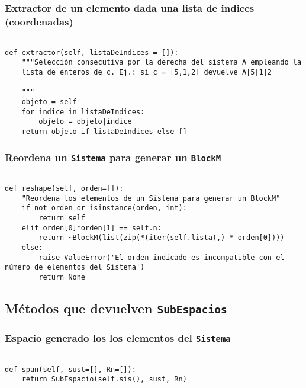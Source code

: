 \documentclass[11pt]{report}
\begin{document}
\subsubsection{Extractor de un elemento dada una lista de indices (coordenadas)}
\label{sec:orgeddb735}

\begin{verbatim}

def extractor(self, listaDeIndices = []):
    """Selección consecutiva por la derecha del sistema A empleando la
    lista de enteros de c. Ej.: si c = [5,1,2] devuelve A|5|1|2

    """
    objeto = self
    for indice in listaDeIndices:
        objeto = objeto|indice
    return objeto if listaDeIndices else []

\end{verbatim}

\subsubsection{Reordena un \texttt{Sistema} para generar un \texttt{BlockM}}
\label{sec:org737c281}
\begin{verbatim}
   
def reshape(self, orden=[]):
    "Reordena los elementos de un Sistema para generar un BlockM"
    if not orden or isinstance(orden, int):
        return self
    elif orden[0]*orden[1] == self.n:
        return ~BlockM(list(zip(*(iter(self.lista),) * orden[0])))
    else:
        raise ValueError('El orden indicado es incompatible con el número de elementos del Sistema')
        return None

\end{verbatim}

\subsection{Métodos que devuelven \texttt{SubEspacios}}
\label{sec:org2d8c316}
\subsubsection{Espacio generado los los elementos del \texttt{Sistema}}
\label{sec:org2cf2d64}

\begin{verbatim}

def span(self, sust=[], Rn=[]):
    return SubEspacio(self.sis(), sust, Rn)

\end{verbatim}
\end{document}

